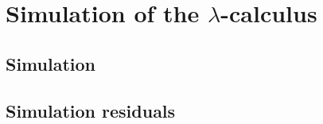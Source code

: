 
\chapter{Simulation of the $\lambda$-calculus}

\section{Simulation}

\section{Simulation residuals}


